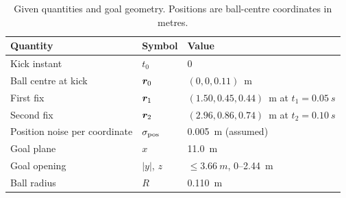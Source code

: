 \begin{table}[htbp]
  \centering
  \small
  \caption{Given quantities and goal geometry. Positions are ball-centre
  coordinates in metres.}
  \label{tab:given}
  \begin{tabular}{@{}lll@{}}
    \toprule
    Quantity & Symbol & Value \\
    \midrule
    Kick instant & $t_0$ & $0$ \\
    Ball centre at kick & $\bm{r}_0$ & $(0,0,0.11)$~m \\
    First fix & $\bm{r}_1$ & $(1.50,0.45,0.44)$~m at $t_1=\SI{0.05}{s}$ \\
    Second fix & $\bm{r}_2$ & $(2.96,0.86,0.74)$~m at $t_2=\SI{0.10}{s}$ \\
    Position noise per coordinate & $\sigma_{\rm pos}$ & \SI{0.005}{m} (assumed) \\
    Goal plane & $x$ & \SI{11.0}{m} \\
    Goal opening & $|y|$, $z$ & $\le\SI{3.66}{m}$, $0$--\SI{2.44}{m} \\
    Ball radius & $R$ & \SI{0.110}{m} \\
    \bottomrule
  \end{tabular}
\end{table}
